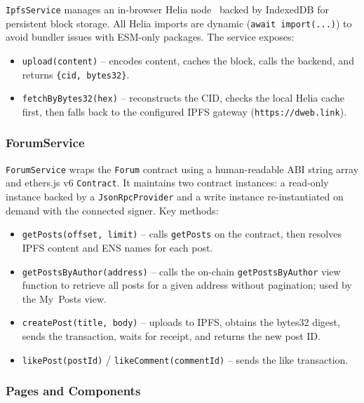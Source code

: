 \documentclass[11pt]{article}
\begin{document}
\texttt{IpfsService} manages an in-browser Helia node~\cite{helia2023} backed by IndexedDB for persistent block storage. All Helia imports are dynamic (\texttt{await import(...)}) to avoid bundler issues with ESM-only packages. The service exposes:
\begin{itemize}
  \item \texttt{upload(content)} – encodes content, caches the block, calls the backend, and returns \texttt{\{cid, bytes32\}}.
  \item \texttt{fetchByBytes32(hex)} – reconstructs the CID, checks the local Helia cache first, then falls back to the configured IPFS gateway (\texttt{https://dweb.link}).
\end{itemize}

\subsubsection{ForumService}

\texttt{ForumService} wraps the \texttt{Forum} contract using a human-readable ABI string array and ethers.js v6 \texttt{Contract}. It maintains two contract instances: a read-only instance backed by a \texttt{JsonRpcProvider} and a write instance re-instantiated on demand with the connected signer. Key methods:
\begin{itemize}
  \item \texttt{getPosts(offset, limit)} – calls \texttt{getPosts} on the contract, then resolves IPFS content and ENS names for each post.
  \item \texttt{getPostsByAuthor(address)} – calls the on-chain \texttt{getPostsByAuthor} view function to retrieve all posts for a given address without pagination; used by the My~Posts view.
  \item \texttt{createPost(title, body)} – uploads to IPFS, obtains the bytes32 digest, sends the transaction, waits for receipt, and returns the new post ID.
  \item \texttt{likePost(postId)} / \texttt{likeComment(commentId)} – sends the like transaction.
\end{itemize}

\subsubsection{Pages and Components}
\end{document}
